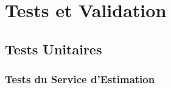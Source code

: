 
\chapter{Tests et Validation}
\label{annexe:tests}

\section{Tests Unitaires}

\subsection{Tests du Service d'Estimation}

